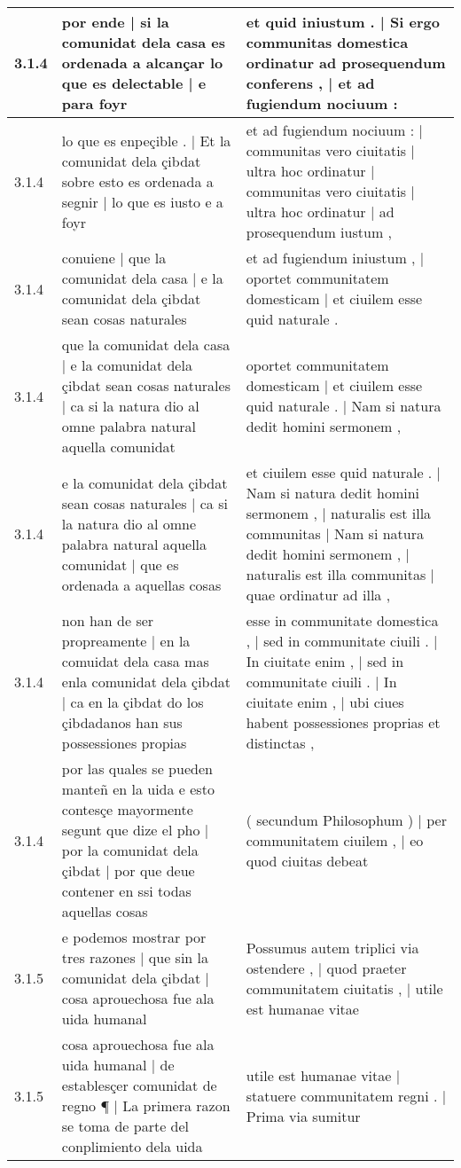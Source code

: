 \begin{tabular}{|p{1cm}|p{6.5cm}|p{6.5cm}|}
3.1.4 & por ende | si la comunidat dela casa es ordenada a alcançar lo que es delectable | e para foyr & et quid iniustum . | Si ergo communitas domestica ordinatur ad prosequendum conferens , | et ad fugiendum nociuum : \\\hline
3.1.4 & lo que es enpeçible . | Et la comunidat dela çibdat sobre esto es ordenada a segnir | lo que es iusto e a foyr & et ad fugiendum nociuum : | communitas vero ciuitatis | ultra hoc ordinatur | communitas vero ciuitatis | ultra hoc ordinatur | ad prosequendum iustum , \\\hline
3.1.4 & conuiene | que la comunidat dela casa | e la comunidat dela çibdat sean cosas naturales & et ad fugiendum iniustum , | oportet communitatem domesticam | et ciuilem esse quid naturale . \\\hline
3.1.4 & que la comunidat dela casa | e la comunidat dela çibdat sean cosas naturales | ca si la natura dio al omne palabra natural aquella comunidat & oportet communitatem domesticam | et ciuilem esse quid naturale . | Nam si natura dedit homini sermonem , \\\hline
3.1.4 & e la comunidat dela çibdat sean cosas naturales | ca si la natura dio al omne palabra natural aquella comunidat | que es ordenada a aquellas cosas & et ciuilem esse quid naturale . | Nam si natura dedit homini sermonem , | naturalis est illa communitas | Nam si natura dedit homini sermonem , | naturalis est illa communitas | quae ordinatur ad illa , \\\hline
3.1.4 & non han de ser propreamente | en la comuidat dela casa mas enla comunidat dela çibdat | ca en la çibdat do los çibdadanos han sus possessiones propias & esse in communitate domestica , | sed in communitate ciuili . | In ciuitate enim , | sed in communitate ciuili . | In ciuitate enim , | ubi ciues habent possessiones proprias et distinctas , \\\hline
3.1.4 & por las quales se pueden manteñ en la uida e esto contesçe mayormente segunt que dize el pho | por la comunidat dela çibdat | por que deue contener en ssi todas aquellas cosas & ( secundum Philosophum ) | per communitatem ciuilem , | eo quod ciuitas debeat \\\hline
3.1.5 & e podemos mostrar por tres razones | que sin la comunidat dela çibdat | cosa aprouechosa fue ala uida humanal & Possumus autem triplici via ostendere , | quod praeter communitatem ciuitatis , | utile est humanae vitae \\\hline
3.1.5 & cosa aprouechosa fue ala uida humanal | de establesçer comunidat de regno ¶ | La primera razon se toma de parte del conplimiento dela uida & utile est humanae vitae | statuere communitatem regni . | Prima via sumitur \\\hline

\end{tabular}
